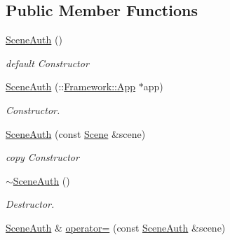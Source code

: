 \subsection*{Public Member Functions}
\begin{DoxyCompactItemize}
\item 
\hypertarget{classContent_1_1SceneAuth_af100de5364b360fe522d21d397305032}{
\hyperlink{classContent_1_1SceneAuth_af100de5364b360fe522d21d397305032}{SceneAuth} ()}
\label{classContent_1_1SceneAuth_af100de5364b360fe522d21d397305032}

\begin{DoxyCompactList}\small\item\em default Constructor \item\end{DoxyCompactList}\item 
\hypertarget{classContent_1_1SceneAuth_a3b711e32187b923892e47cd8a6b3d681}{
\hyperlink{classContent_1_1SceneAuth_a3b711e32187b923892e47cd8a6b3d681}{SceneAuth} (::\hyperlink{classFramework_1_1App}{Framework::App} $\ast$app)}
\label{classContent_1_1SceneAuth_a3b711e32187b923892e47cd8a6b3d681}

\begin{DoxyCompactList}\small\item\em Constructor. \item\end{DoxyCompactList}\item 
\hypertarget{classContent_1_1SceneAuth_a9cbf733fd053875f35d226e813d8dddf}{
\hyperlink{classContent_1_1SceneAuth_a9cbf733fd053875f35d226e813d8dddf}{SceneAuth} (const \hyperlink{classContent_1_1Scene}{Scene} \&scene)}
\label{classContent_1_1SceneAuth_a9cbf733fd053875f35d226e813d8dddf}

\begin{DoxyCompactList}\small\item\em copy Constructor \item\end{DoxyCompactList}\item 
\hypertarget{classContent_1_1SceneAuth_a620bed4ef88cc689456d68ab8fbb4271}{
\hyperlink{classContent_1_1SceneAuth_a620bed4ef88cc689456d68ab8fbb4271}{$\sim$SceneAuth} ()}
\label{classContent_1_1SceneAuth_a620bed4ef88cc689456d68ab8fbb4271}

\begin{DoxyCompactList}\small\item\em Destructor. \item\end{DoxyCompactList}\item 
\hypertarget{classContent_1_1SceneAuth_a82276e4f773d56c9c7368b93d063dbd7}{
\hyperlink{classContent_1_1SceneAuth}{SceneAuth} \& \hyperlink{classContent_1_1SceneAuth_a82276e4f773d56c9c7368b93d063dbd7}{operator=} (const \hyperlink{classContent_1_1SceneAuth}{SceneAuth} \&scene)}
\label{classContent_1_1SceneAuth_a82276e4f773d56c9c7368b93d063dbd7}


\end{DoxyCompactItemize}
